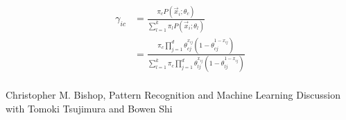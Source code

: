 \documentclass{introtosml}
\newcommand{\x}{\vec{x}}
\newcommand\pinb[1]{\pi_c \prod_{j=1}^d \theta_{#1 j}^{x_{ij}} (1 - \theta_{#1 j}^{1 - x_{ij}})}
\begin{document}
\begin{p}
  \item
    \begin{align*}
      \gamma_{ic}
      & = \frac{\pi_c P(\x_i; \theta_c)}{\sum_{l=1}^k \pi_l P(\x_i; \theta_l)} \\
      & = \frac{\pinb{c}}{\sum_{l=1}^k \pinb{l}} \\
    \end{align*}
\end{p}

\begin{thebibliography}{9}
   Christopher M. Bishop, Pattern Recognition and Machine Learning
   Discussion with Tomoki Tsujimura and Bowen Shi
\end{thebibliography}
\end{document}
